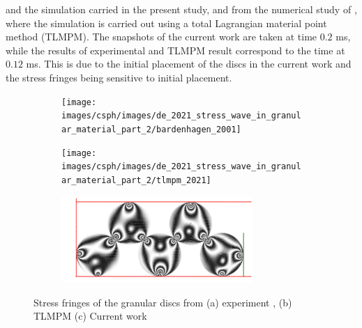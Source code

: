 and the simulation carried in the present study, and from the numerical study
of \cite{de2021modelling}, where the simulation is carried out using a total
Lagrangian material point method (TLMPM). The snapshots of the current work
are taken at time $0.2$ ms, while the results of experimental and TLMPM result
correspond to the time at $0.12$ ms. This is due to the initial placement of
the discs in the current work and the stress fringes being sensitive to
initial placement.
\begin{figure}[!htpb]
  \centering
  \begin{subfigure}{1.0\textwidth}
    \centering
    \texttt{[image: images/csph/images/de\_2021\_stress\_wave\_in\_granular\_material\_part\_2/bardenhagen\_2001]}
    \subcaption{}\label{fig:de-stress-wave-bardenhagen}
  \end{subfigure}

  \begin{subfigure}{1.0\textwidth}
    \centering
    \texttt{[image: images/csph/images/de\_2021\_stress\_wave\_in\_granular\_material\_part\_2/tlmpm\_2021]}
    \subcaption{}\label{}
  \end{subfigure}

  \begin{subfigure}{1.0\textwidth}
    \centering
    \includegraphics[width=0.8\textwidth]{figures/csph/figures/de_2021_stress_wave_in_granular_material_part_2/case_mohseni/time0}
    \subcaption{}\label{fig:de-stress-wave-current}
  \end{subfigure}
  \caption{Stress fringes of the granular discs from (a) experiment
    \citep{guilkey2001improved}, (b) TLMPM \citep{de2021modelling} (c) Current work}
\label{fig:de-stress-wave-compare}
\end{figure}
